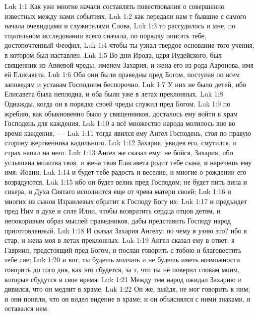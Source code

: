 \vs Luk 1:1 Как уже многие начали составлять повествования о совершенно известных между нами событиях,
\vs Luk 1:2 как передали нам т бывшие с самого начала очевидцами и служителями Слова,
\vs Luk 1:3 то рассудилось и мне, по тщательном исследовании всего сначала, по порядку описать тебе, достопочтенный Феофил,
\vs Luk 1:4 чтобы ты узнал твердое основание того учения, в котором был наставлен.
\rsbpar\vs Luk 1:5 Во дни Ирода, царя Иудейского, был священник из Авиевой чреды, именем Захария, и жена его из рода Ааронова, имя ей Елисавета.
\vs Luk 1:6 Оба они были праведны пред Богом, поступая по всем заповедям и уставам Господним беспорочно.
\vs Luk 1:7 У них не было детей, ибо Елисавета была неплодна, и оба были уже в летах преклонных.
\vs Luk 1:8 Однажды, когда он в порядке своей чреды служил пред Богом,
\vs Luk 1:9 по жребию, как обыкновенно было у священников, досталось ему войти в храм Господень для каждения,
\vs Luk 1:10 а всё множество народа молилось вне во время каждения,~---
\vs Luk 1:11 тогда явился ему Ангел Господень, стоя по правую сторону жертвенника кадильного.
\vs Luk 1:12 Захария, увидев его, смутился, и страх напал на него.
\vs Luk 1:13 Ангел же сказал ему: не бойся, Захария, ибо услышана молитва твоя, и жена твоя Елисавета родит тебе сына, и наречешь ему имя: Иоанн;
\vs Luk 1:14 и будет тебе радость и веселие, и многие о рождении его возрадуются,
\vs Luk 1:15 ибо он будет велик пред Господом; не будет пить вина и сикера, и Духа Святаго исполнится еще от чрева матери своей;
\vs Luk 1:16 и многих из сынов Израилевых обратит к Господу Богу их;
\vs Luk 1:17 и предъидет пред Ним в духе и силе Илии, чтобы возвратить сердца отцов детям, и непокоривым образ мыслей праведников, дабы представить Господу народ приготовленный.
\vs Luk 1:18 И сказал Захария Ангелу: по чему я узню это? ибо я стар, и жена моя в летах преклонных.
\vs Luk 1:19 Ангел сказал ему в ответ: я Гавриил, предстоящий пред Богом, и послан говорить с тобою и благовестить тебе сие;
\vs Luk 1:20 и вот, ты будешь молчать и не будешь иметь возможности говорить до того дня, как это сбудется, за т, что ты не поверил словам моим, которые сбудутся в свое время.
\vs Luk 1:21 Между тем народ ожидал Захарию и дивился, что он медлит в храме.
\vs Luk 1:22 Он же, выйдя, не мог говорить к ним; и они поняли, что он видел видение в храме; и он объяснялся с ними знаками, и оставался нем.
